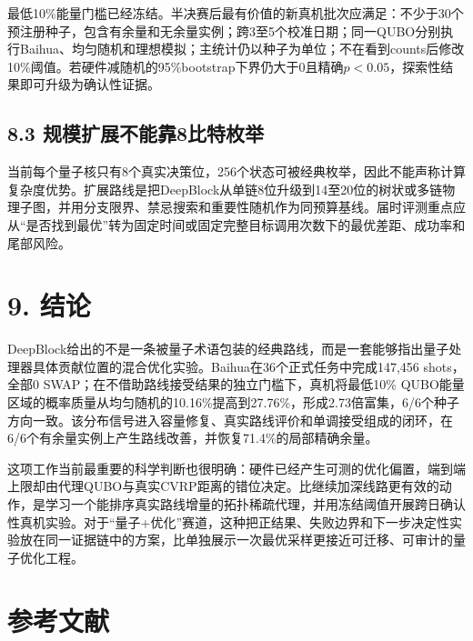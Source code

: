 \documentclass[
  10.5pt,
  UTF8]{ctexart}
\begin{document}
最低10\%能量门槛已经冻结。半决赛后最有价值的新真机批次应满足：不少于30个预注册种子，包含有余量和无余量实例；跨3至5个校准日期；同一QUBO分别执行Baihua、均匀随机和理想模拟；主统计仍以种子为单位；不在看到counts后修改10\%阈值。若硬件减随机的95\%bootstrap下界仍大于0且精确\(p<0.05\)，探索性结果即可升级为确认性证据。

\subsection{8.3 规模扩展不能靠8比特枚举}\label{ux89c4ux6a21ux6269ux5c55ux4e0dux80fdux97608ux6bd4ux7279ux679aux4e3e}

当前每个量子核只有8个真实决策位，256个状态可被经典枚举，因此不能声称计算复杂度优势。扩展路线是把DeepBlock从单链8位升级到14至20位的树状或多链物理子图，并用分支限界、禁忌搜索和重要性随机作为同预算基线。届时评测重点应从``是否找到最优''转为固定时间或固定完整目标调用次数下的最优差距、成功率和尾部风险。

\section{9. 结论}\label{ux7ed3ux8bba}

DeepBlock给出的不是一条被量子术语包装的经典路线，而是一套能够指出量子处理器具体贡献位置的混合优化实验。Baihua在36个正式任务中完成147,456 shots，全部0 SWAP；在不借助路线接受结果的独立门槛下，真机将最低10\% QUBO能量区域的概率质量从均匀随机的10.16\%提高到27.76\%，形成2.73倍富集，6/6个种子方向一致。该分布信号进入容量修复、真实路线评价和单调接受组成的闭环，在6/6个有余量实例上产生路线改善，并恢复71.4\%的局部精确余量。

这项工作当前最重要的科学判断也很明确：硬件已经产生可测的优化偏置，端到端上限却由代理QUBO与真实CVRP距离的错位决定。比继续加深线路更有效的动作，是学习一个能排序真实路线增量的拓扑稀疏代理，并用冻结阈值开展跨日确认性真机实验。对于``量子+优化''赛道，这种把正结果、失败边界和下一步决定性实验放在同一证据链中的方案，比单独展示一次最优采样更接近可迁移、可审计的量子优化工程。

\section{参考文献}\label{ux53c2ux8003ux6587ux732e}
\end{document}
